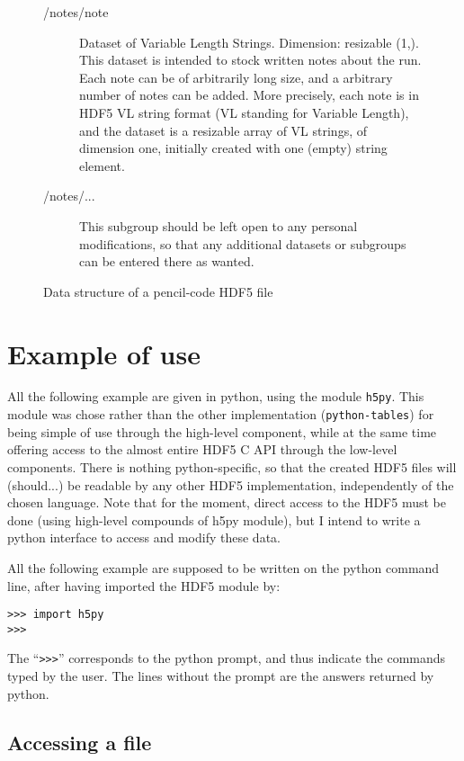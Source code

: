 \documentclass[a4paper,12pt]{article}
\begin{document}
\begin{figure}[p]
{\begin{description}
\begin{description}
\begin{description}
    \item[/notes/note] Dataset of Variable Length Strings. Dimension:
      resizable (1,). This dataset is intended to stock written notes
      about the run. Each note can be of arbitrarily long size, and a
      arbitrary number of notes can be added. More precisely, each
      note is in HDF5 VL string format (VL standing for Variable
      Length), and the dataset is a resizable array of VL strings, of
      dimension one, initially created with one (empty) string
      element.
    \item[/notes/...] This subgroup should be left open to any personal
      modifications, so that any additional datasets or subgroups can
      be entered there as wanted.
    \end{description}
  \end{description}
\end{description}
}%
\caption{Data structure of a pencil-code HDF5 file}
\label{fig:data-struct}
\end{figure}
\section{Example of use}
\label{sec:example-use}

All the following example are given in python, using the module
\texttt{h5py}. This module was chose rather than the other
implementation (\texttt{python-tables}) for being simple of use
through the high-level component, while at the same time offering
access  to the almost entire HDF5 C API through the low-level
components. There is nothing python-specific, so that the created
HDF5 files will (should...) be readable by any other HDF5
implementation, independently of the chosen language. Note that for
the moment, direct access to the HDF5 must be done (using high-level
compounds of h5py module), but I intend to write a python interface to
access and modify these data. 

All the following example are supposed to be written on the python
command line, after having imported the HDF5 module by:
\begin{verbatim}
>>> import h5py
>>>
\end{verbatim}
The ``\texttt{>>>}'' corresponds to the python prompt, and thus indicate
the commands typed by the user. The lines without the prompt are the
answers returned by python.


\subsection{Accessing a file}
\label{sec:opening-file}
\end{document}

